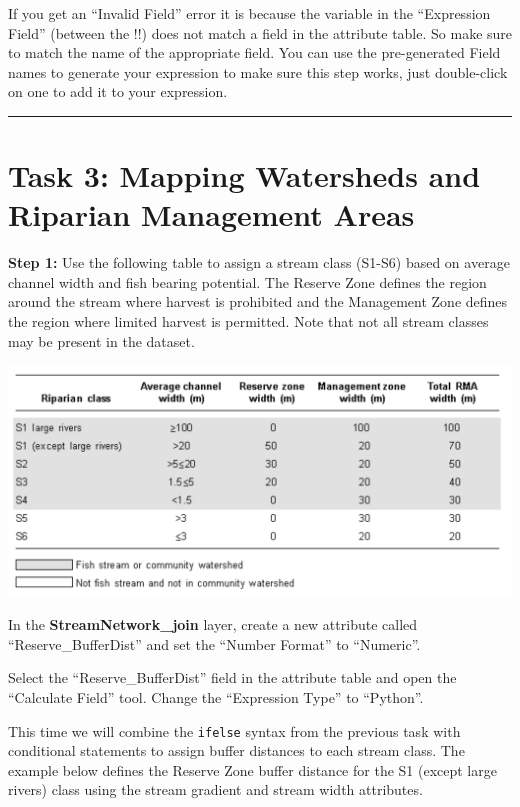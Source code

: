 \documentclass[
]{book}
\begin{document}
If you get an ``Invalid Field'' error it is because the variable in the ``Expression Field'' (between the !!) does not match a field in the attribute table. So make sure to match the name of the appropriate field. You can use the pre-generated Field names to generate your expression to make sure this step works, just double-click on one to add it to your expression.

\begin{center}\rule{0.5\linewidth}{0.5pt}\end{center}

\hypertarget{task-3-mapping-watersheds-and-riparian-management-areas}{%
\section{Task 3: Mapping Watersheds and Riparian Management Areas}\label{task-3-mapping-watersheds-and-riparian-management-areas}}

\textbf{Step 1:} Use the following table to assign a stream class (S1-S6) based on average channel width and fish bearing potential. The Reserve Zone defines the region around the stream where harvest is prohibited and the Management Zone defines the region where limited harvest is permitted. Note that not all stream classes may be present in the dataset.

\includegraphics[width=0.75\linewidth]{images/03-stream-class}

In the \textbf{StreamNetwork\_join} layer, create a new attribute called ``Reserve\_BufferDist'' and set the ``Number Format'' to ``Numeric''.

Select the ``Reserve\_BufferDist'' field in the attribute table and open the ``Calculate Field'' tool. Change the ``Expression Type'' to ``Python''.

This time we will combine the \texttt{ifelse} syntax from the previous task with conditional statements to assign buffer distances to each stream class. The example below defines the Reserve Zone buffer distance for the S1 (except large rivers) class using the stream gradient and stream width attributes.
\end{document}
